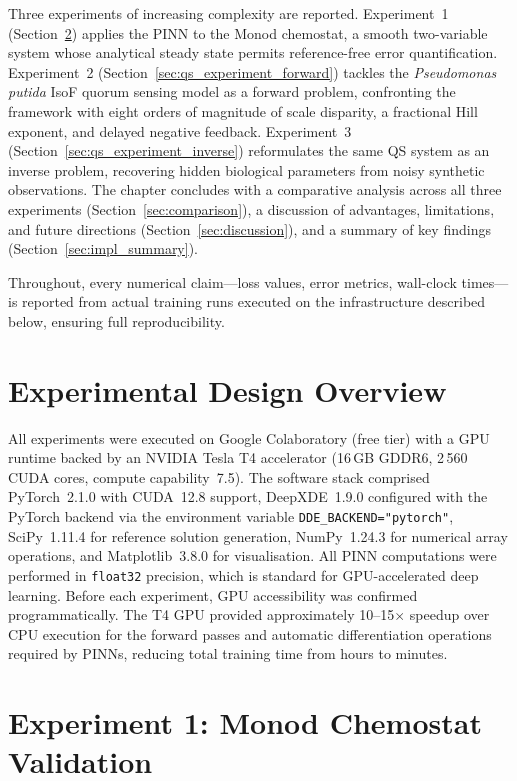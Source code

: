 \documentclass[14pt,a4paper,openany]{extbook}
\begin{document}
Three experiments of increasing complexity are reported. Experiment~1 (Section~\ref{sec:monod_experiment}) applies the PINN to the Monod chemostat, a smooth two-variable system whose analytical steady state permits reference-free error quantification. Experiment~2 (Section~\ref{sec:qs_experiment_forward}) tackles the \textit{Pseudomonas putida} IsoF quorum sensing model as a forward problem, confronting the framework with eight orders of magnitude of scale disparity, a fractional Hill exponent, and delayed negative feedback. Experiment~3 (Section~\ref{sec:qs_experiment_inverse}) reformulates the same QS system as an inverse problem, recovering hidden biological parameters from noisy synthetic observations. The chapter concludes with a comparative analysis across all three experiments (Section~\ref{sec:comparison}), a discussion of advantages, limitations, and future directions (Section~\ref{sec:discussion}), and a summary of key findings (Section~\ref{sec:impl_summary}).

Throughout, every numerical claim---loss values, error metrics, wall-clock times---is reported from actual training runs executed on the infrastructure described below, ensuring full reproducibility.

\section{Experimental Design Overview}
\label{sec:exp_overview}

All experiments were executed on Google Colaboratory (free tier) with a GPU runtime backed by an NVIDIA Tesla T4 accelerator (16\,GB GDDR6, 2\,560 CUDA cores, compute capability~7.5). The software stack comprised PyTorch~2.1.0 with CUDA~12.8 support, DeepXDE~1.9.0 configured with the PyTorch backend via the environment variable \texttt{DDE\_BACKEND="pytorch"}, SciPy~1.11.4 for reference solution generation, NumPy~1.24.3 for numerical array operations, and Matplotlib~3.8.0 for visualisation. All PINN computations were performed in \texttt{float32} precision, which is standard for GPU-accelerated deep learning. Before each experiment, GPU accessibility was confirmed programmatically. The T4 GPU provided approximately 10--15$\times$ speedup over CPU execution for the forward passes and automatic differentiation operations required by PINNs, reducing total training time from hours to minutes.

\section{Experiment 1: Monod Chemostat Validation}
\label{sec:monod_experiment}
\end{document}
